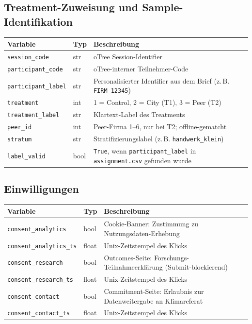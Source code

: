 \documentclass[11pt, a4paper]{scrartcl}
\newcommand{\var}[1]{\texttt{\small #1}}
\begin{document}
\subsection{Treatment-Zuweisung und Sample-Identifikation}

\begin{longtable}{@{}p{3.6cm} p{2.0cm} p{9.5cm}@{}}
\toprule
\textbf{Variable} & \textbf{Typ} & \textbf{Beschreibung} \\
\midrule
\endhead
\var{session\_code}           & str  & oTree Session-Identifier \\
\var{participant\_code}       & str  & oTree-interner Teilnehmer-Code \\
\var{participant\_label}      & str  & Personalisierter Identifier aus dem Brief (z.\,B. \var{FIRM\_12345}) \\
\var{treatment}               & int  & 1 = Control, 2 = City (T1), 3 = Peer (T2) \\
\var{treatment\_label}        & str  & Klartext-Label des Treatments \\
\var{peer\_id}                & int  & Peer-Firma 1--6, nur bei T2; offline-gematcht \\
\var{stratum}                 & str  & Stratifizierungslabel (z.\,B. \var{handwerk\_klein}) \\
\var{label\_valid}            & bool & \var{True}, wenn \var{participant\_label} in \var{assignment.csv} gefunden wurde \\
\bottomrule
\end{longtable}

\subsection{Einwilligungen}

\begin{longtable}{@{}p{3.6cm} p{2.0cm} p{9.5cm}@{}}
\toprule
\textbf{Variable} & \textbf{Typ} & \textbf{Beschreibung} \\
\midrule
\endhead
\var{consent\_analytics}      & bool  & Cookie-Banner: Zustimmung zu Nutzungsdaten-Erhebung \\
\var{consent\_analytics\_ts}  & float & Unix-Zeitstempel des Klicks \\
\var{consent\_research}       & bool  & Outcomes-Seite: Forschungs-Teilnahmeerklärung (Submit-blockierend) \\
\var{consent\_research\_ts}   & float & Unix-Zeitstempel des Klicks \\
\var{consent\_contact}        & bool  & Commitment-Seite: Erlaubnis zur Datenweitergabe an Klimareferat \\
\var{consent\_contact\_ts}    & float & Unix-Zeitstempel des Klicks \\
\bottomrule
\end{longtable}
\end{document}
